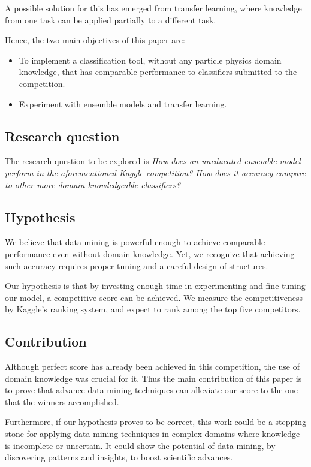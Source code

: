 \documentclass[conference]{IEEEtran}
\begin{document}
A possible solution for this has emerged from transfer learning, where knowledge from one task can be applied partially to a different task.

Hence, the two main objectives of this paper are:

\begin{itemize}
	\item To implement a classification tool, without any particle physics domain knowledge, that has comparable performance to classifiers submitted to the competition.
	\item Experiment with ensemble models and transfer learning.
\end{itemize}

\subsection{Research question}
\label{sec:researchQuestions}
The research question to be explored is \textit{How does an uneducated ensemble model perform in the aforementioned Kaggle competition? How does it accuracy compare to other more domain knowledgeable classifiers?}

\subsection{Hypothesis}
\label{sec:hypothesis}
We believe that data mining is powerful enough to achieve comparable performance even without domain knowledge. Yet, we recognize that achieving such accuracy requires proper tuning and a careful design of structures.

Our hypothesis is that by investing enough time in experimenting and fine tuning our model, a competitive score can be achieved. We measure the competitiveness by Kaggle's ranking system, and expect to rank among the top five competitors.

\subsection{Contribution}
Although perfect score has already been achieved in this competition, the use of domain knowledge was crucial for it. Thus the main contribution of this paper is to prove that advance data mining techniques can alleviate our score to the one that the winners accomplished.

Furthermore, if our hypothesis proves to be correct, this work could be a stepping stone for applying data mining techniques in complex domains where knowledge is incomplete or uncertain. It could show the potential of data mining, by discovering patterns and insights, to boost scientific advances.
\end{document}
